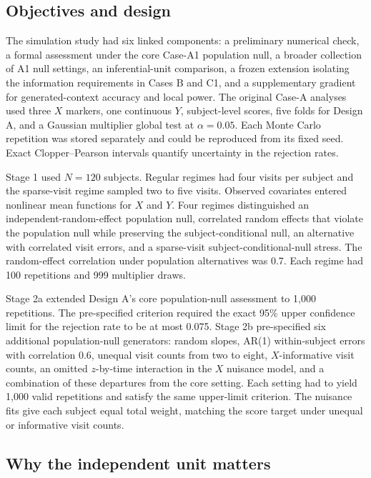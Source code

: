 \documentclass[11pt]{article}
\theoremstyle{definition}
\begin{document}
\subsection{Objectives and design}

The simulation study had six linked components: a preliminary numerical check, a formal
assessment under the core Case-A1 population null, a broader collection of A1 null settings,
an inferential-unit comparison, a frozen extension isolating the information requirements in
Cases B and C1, and a supplementary gradient for generated-context accuracy and local power.
The original Case-A analyses used three $X$ markers, one continuous $Y$,
subject-level scores, five folds for Design A, and a Gaussian multiplier global test at
$\alpha=0.05$. Each Monte Carlo repetition was stored separately and could be reproduced
from its fixed seed. Exact Clopper--Pearson intervals quantify uncertainty in the rejection
rates.

Stage 1 used $N=120$ subjects. Regular regimes had four visits per subject and the
sparse-visit regime sampled two to five visits. Observed covariates entered nonlinear mean
functions for $X$ and $Y$. Four regimes distinguished an independent-random-effect
population null, correlated random effects that violate the population null while preserving
the subject-conditional null, an alternative with correlated visit errors, and a sparse-visit
subject-conditional-null stress. The random-effect correlation under population alternatives
was 0.7. Each regime had 100 repetitions and 999 multiplier draws.

Stage 2a extended Design A's core population-null assessment to 1,000 repetitions. The
pre-specified criterion required the exact 95\% upper confidence limit for the rejection
rate to be at most 0.075.
Stage 2b pre-specified six additional population-null generators: random slopes, AR(1)
within-subject errors with correlation 0.6, unequal visit counts from two to eight,
$X$-informative visit counts, an omitted $z$-by-time interaction in the $X$ nuisance model,
and a combination of these departures from the core setting. Each setting had to yield 1,000
valid repetitions and satisfy the same upper-limit criterion. The nuisance fits give each
subject equal total weight,
matching the score target under unequal or informative visit counts.

\subsection{Why the independent unit matters}
\end{document}
